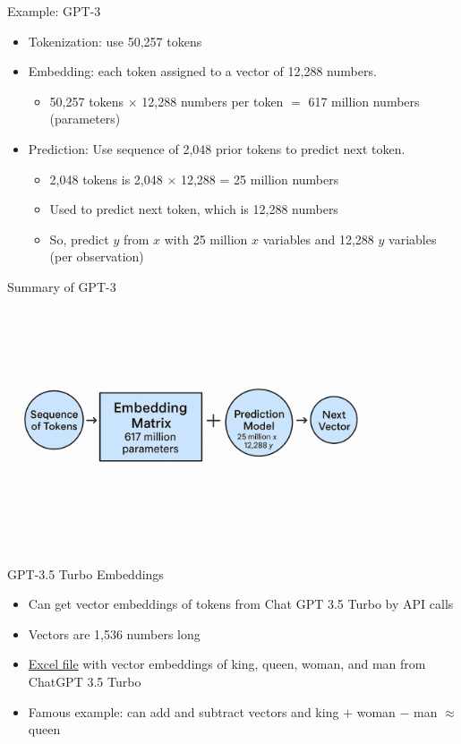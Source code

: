 \documentclass[10pt]{beamer}
\begin{document}
\begin{frame}{Example: GPT-3}
    \begin{itemize}
        \item Tokenization: use 50,257 tokens
        \item Embedding: each token assigned to a vector of 12,288 numbers. 
        \begin{itemize}
        \item 50,257 tokens $\times$ 12,288 numbers per token $=$ 617 million numbers (parameters)
        \end{itemize}
        \item Prediction: Use sequence of 2,048 prior tokens to predict next token.
        \vspace{-1em}
        \begin{itemize}
        \item 2,048 tokens is 2,048 $\times$ 12,288 = 25 million numbers 
        \item Used to predict next token, which is 
        12,288 numbers
        \item So, predict $y$ from $x$ with 25 million $x$ variables and 12,288 $y$ variables (per observation)
        \end{itemize}
    \end{itemize}
\end{frame}

\begin{frame}{Summary of GPT-3}
    \begin{center}
    \includegraphics[width=0.8\textwidth]{../images/gpt5.png}
    \end{center}
\end{frame}

\begin{frame}{GPT-3.5 Turbo Embeddings}
    \begin{itemize}
        \item Can get vector embeddings of tokens from Chat GPT 3.5 Turbo by API calls 
        \item Vectors are 1,536 numbers long
        \item \href{https://mgmt675-2025/assets/embeddings.xlsx}{Excel file} with vector embeddings of king, queen, woman, and man from ChatGPT 3.5 Turbo
        \item Famous example: can add and subtract vectors and king $+$ woman $-$ man $\approx$ queen
    \end{itemize}
\end{frame}
\end{document}
